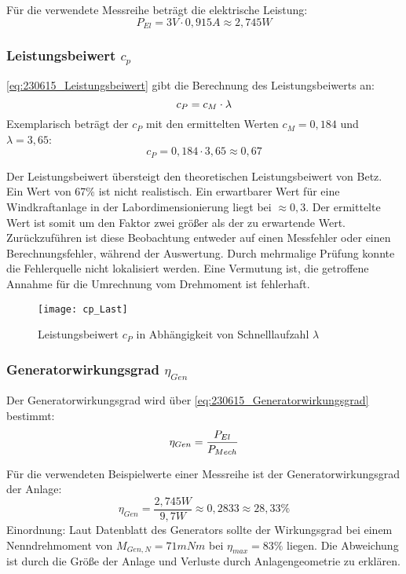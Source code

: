 Für die verwendete Messreihe beträgt die elektrische Leistung:
$$P_{El} = 3V \cdot 0,915A \approx 2,745W$$

\newpage
\subsubsection*{Leistungsbeiwert $c_p$}
\autoref{eq:230615_Leistungsbeiwert} gibt die Berechnung des Leistungsbeiwerts an:
 \begin{equation}
     \centering
     c_P = c_M \cdot \lambda
     \label{eq:230615_Leistungsbeiwert}
 \end{equation}
Exemplarisch beträgt der $c_P$ mit den ermittelten Werten $c_M = 0,184 $ und $\lambda = 3,65$:
 $$c_P = 0,184 \cdot 3,65 \approx 0,67$$

 Der Leistungsbeiwert übersteigt den theoretischen Leistungsbeiwert von Betz. Ein Wert von 67\% ist nicht realistisch. Ein erwartbarer Wert für eine Windkraftanlage in der Labordimensionierung liegt bei $\approx 0,3$. Der ermittelte Wert ist somit um den Faktor zwei größer als der zu erwartende Wert. Zurückzuführen ist diese Beobachtung entweder auf einen Messfehler oder einen Berechnungsfehler, während der Auswertung. Durch mehrmalige Prüfung konnte die Fehlerquelle nicht lokalisiert werden. Eine Vermutung ist, die getroffene Annahme für die Umrechnung vom Drehmoment ist fehlerhaft.
 \begin{figure}[H]
    \centering
    \texttt{[image: cp\_Last]}
    \caption{Leistungsbeiwert $c_P$ in Abhängigkeit von Schnelllaufzahl $\lambda$}
    \label{fig:cp_last}
\end{figure}
\newpage
\subsubsection*{Generatorwirkungsgrad $\eta_{Gen}$}
Der Generatorwirkungsgrad wird über \autoref{eq:230615_Generatorwirkungsgrad} bestimmt:
\begin{equation}
    \centering
    \eta_{Gen} = \frac{P_{El}}{P_{Mech}}
    \label{eq:230615_Generatorwirkungsgrad}
\end{equation}

Für die verwendeten Beispielwerte einer Messreihe ist der Generatorwirkungsgrad der Anlage:
$$\eta_{Gen} = \frac{2,745W}{9,7W} \approx 0,2833 \approx 28,33\% $$
Einordnung:
Laut Datenblatt des Generators sollte der Wirkungsgrad bei einem Nenndrehmoment von $M_{Gen,N}= 71 mNm$ bei $\eta_{max}=83\%$ liegen.
Die Abweichung ist durch die Größe der Anlage und Verluste durch Anlagengeometrie zu erklären.

